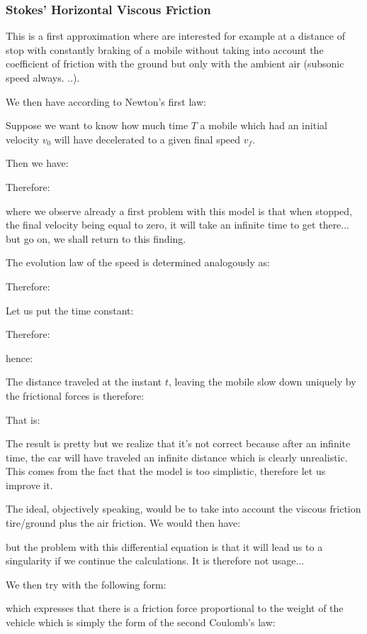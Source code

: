 	\pagebreak
	\subsubsection{Stokes' Horizontal Viscous Friction}
	This is a first approximation where are interested for example at a distance of stop with constantly braking of a mobile without taking into account the coefficient of friction with the ground but only with the ambient air (subsonic speed always. ..).

	We then have according to Newton's first law:
	
	Suppose we want to know how much time $T$ a mobile which had an initial velocity $v_0$ will have decelerated to a given final speed $v_f$.

	Then we have:
	
	Therefore:
	
	where we observe already a first problem with this model is that when stopped, the final velocity being equal to zero, it will take an infinite time to get there... but go on, we shall return to this finding.

	The evolution law of the speed is determined analogously as:
	
	Therefore:
	
	Let us put the time constant:
	
	Therefore:
	
	hence:
	
	The distance traveled at the instant $t$, leaving the mobile slow down uniquely by the frictional forces is therefore:
	
	That is:
	
	The result is pretty but we realize that it's not correct because after an infinite time, the car will have traveled an infinite distance which is clearly unrealistic. This comes from the fact that the model is too simplistic, therefore let us improve it.

	The ideal, objectively speaking, would be to take into account the viscous friction tire/ground plus the air friction. We would then have:
	
	but the problem with this differential equation is that it will lead us to a singularity if we continue the calculations. It is therefore not usage...

	We then try with the following form:
	
	which expresses that there is a friction force proportional to the weight of the vehicle which is simply the form of the second Coulomb's law:
	
